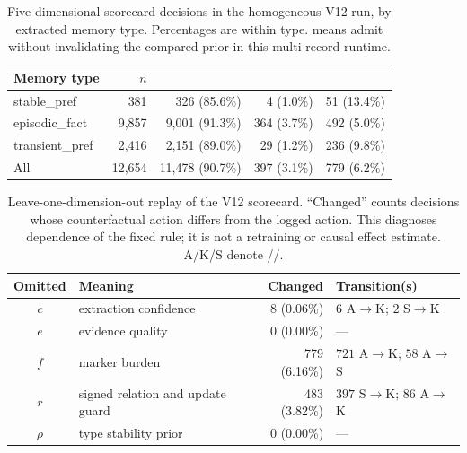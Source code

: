 \begin{table}[t]
\centering
\small
\caption{Five-dimensional scorecard decisions in the homogeneous \lme{} V12
run, by extracted memory type. Percentages are within type. \keep{} means
admit without invalidating the compared prior in this multi-record runtime.}
\label{tab:lme-scorecard-types}
\setlength{\tabcolsep}{4.5pt}
\begin{tabular}{@{}lrrrr@{}}
\toprule
Memory type & $n$ & \keep{} & \supersede{} & \abstain{} \\
\midrule
\textsf{stable\_pref}
  & 381 & 326 (85.6\%) & 4 (1.0\%) & 51 (13.4\%) \\
\textsf{episodic\_fact}
  & 9,857 & 9,001 (91.3\%) & 364 (3.7\%) & 492 (5.0\%) \\
\textsf{transient\_pref}
  & 2,416 & 2,151 (89.0\%) & 29 (1.2\%) & 236 (9.8\%) \\
\midrule
All & 12,654 & 11,478 (90.7\%) & 397 (3.1\%) & 779 (6.2\%) \\
\bottomrule
\end{tabular}
\end{table}

\begin{table}[t]
\centering
\small
\caption{Leave-one-dimension-out replay of the V12 scorecard. ``Changed''
counts decisions whose counterfactual action differs from the logged action.
This diagnoses dependence of the fixed rule; it is not a retraining or causal
effect estimate. A/K/S denote \abstain/\keep/\supersede.}
\label{tab:lme-scorecard-ablation}
\setlength{\tabcolsep}{4pt}
\begin{tabular}{@{}clrl@{}}
\toprule
Omitted & Meaning & Changed & Transition(s) \\
\midrule
$c$ & extraction confidence & 8 (0.06\%) &
  $6$ A$\to$K; $2$ S$\to$K \\
$e$ & evidence quality & 0 (0.00\%) & --- \\
$f$ & marker burden & 779 (6.16\%) &
  $721$ A$\to$K; $58$ A$\to$S \\
$r$ & signed relation and update guard & 483 (3.82\%) &
  $397$ S$\to$K; $86$ A$\to$K \\
$\rho$ & type stability prior & 0 (0.00\%) & --- \\
\bottomrule
\end{tabular}
\end{table}
